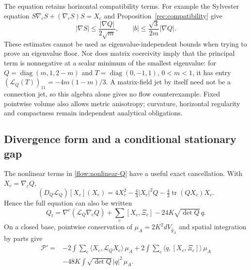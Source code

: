 \documentclass[11pt]{article}
\numberwithin{equation}{section}
\theoremstyle{definition}
\theoremstyle{remark}
\DeclareMathOperator{\tr}{tr}
\begin{document}
The equation retains horizontal compatibility terms. For example the
Sylvester equation $S\nabla_cS+(\nabla_cS)S=X_c$ and
Proposition~\ref{rec:compatibility} give
\[
 |\nabla S|\leq\frac{|\nabla Q|}{2\sqrt m},\qquad
 |b|\leq\frac{\sqrt3}{2m}|\nabla Q|.
\]
These estimates cannot be used as eigenvalue-independent bounds when
trying to prove an eigenvalue floor. Nor does matrix coercivity imply
that the principal term is nonnegative at a scalar minimum of the
smallest eigenvalue: for $Q=\operatorname{diag}(m,1,2-m)$ and
$T=\operatorname{diag}(0,-1,1)$, $0<m<1$, it has entry
$(\mathscr L_Q(T))_{11}=-4m(1-m)/3$. A matrix-field jet by itself
need not be a connection jet, so this algebra alone gives no flow
counterexample. Fixed pointwise volume also allows metric anisotropy;
curvature, horizontal regularity and compactness remain independent
analytical obligations.


\subsection{Divergence form and a conditional stationary gap}
\label{subsec:pinched-energy}

The nonlinear terms in \eqref{flow:nonlinear-Q} have a useful exact
cancellation. With $X_c=\nabla_cQ$,
\[
 (D_Q\mathscr L_Q)[X_c](X_c)
 =4X_c^2-\tfrac43|X_c|^2Q-\tfrac43\tr(QX_c)X_c.
\]
Hence the full equation can also be written
\begin{equation}\label{flow:divergence-Q}
 Q_t=\nabla^c(\mathscr L_Q\nabla_cQ)
       +\sum_c[X_c,\Xi_c]-24K\sqrt{\det Q}\,q.
\end{equation}
On a closed base, pointwise conservation of $\mu_A=2K^2dV_{\widehat g_A}$
and spatial integration by parts give
\begin{align}
 \mathcal P'={}&-2\int\sum_c\langle X_c,\mathscr L_QX_c\rangle\,\mu_A
       +2\int\sum_c\langle q,[X_c,\Xi_c]\rangle\,\mu_A\nonumber\\
       &-48K\int\sqrt{\det Q}|q|^2\,\mu_A.
 \label{flow:exact-energy-Q}
\end{align}
\end{document}

